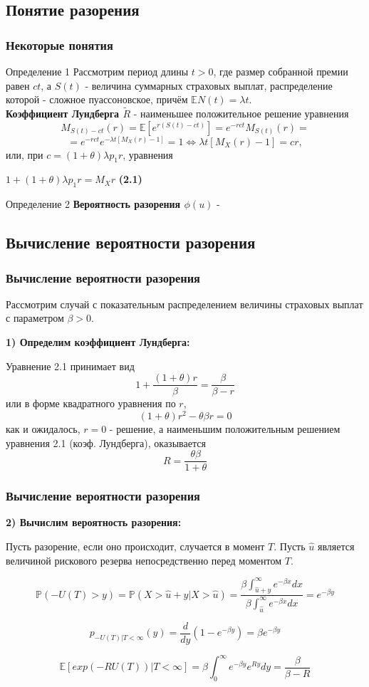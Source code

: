 \documentclass[12pt]{beamer}
\begin{document}
\begin{frame}
\section{Понятие разорения}
\frametitle{Некоторые понятия}
\begin{block}{Определение 1}
Рассмотрим период длины $t > 0$, где размер собранной  премии равен $ct$, а $S(t)$ - величина суммарных страховых выплат, распределение которой - сложное пуассоновское, причём $\mathbb{E}N(t) = {\lambda}t$.
\\ \textbf{Коэффициент Лундберга $\widetilde{R}$} - наименьшее положительное решение уравнения $$M_{S(t)-ct}(r) = \mathbb{E}[e^{r(S(t)-ct)}] = e^{-rct}M_{S(t)}(r) = $$ $$= e^{-rct}e^{-{\lambda}t[M_{X}(r)-1]} = 1 \Leftrightarrow {\lambda}t[M_{X}(r)-1] = cr,$$или, при $c = (1+{\theta}){\lambda}p_{1}r$, уравнения 
\begin{center}$1+(1+\theta){\lambda}p_{1}r = M_{X}r$ \textbf{(2.1)} \end{center}
\end{block}
\begin{block}{Определение 2}
\textbf{Вероятность разорения $\phi(u)$} - 
\end{block}
\end{frame}


\begin{frame}
\section{Вычисление вероятности разорения}
\frametitle{Вычисление вероятности разорения}
Рассмотрим случай с показательным распределением величины страховых выплат с параметром $\beta > 0$.

\textbf{1) Определим коэффициент Лундберга:}

Уравнение 2.1 принимает вид
$$1 + \frac{(1 + \theta)r}{\beta}=\frac{\beta}{\beta-r}$$
или в форме квадратного уравнения по $r$,
$$(1 + \theta)r^2 - \theta\beta r = 0$$
как и ожидалось, $r = 0$ - решение, а наименьшим положительным решением уравнения 2.1
(коэф. Лундберга), оказывается 
$$R = \frac{\theta\beta}{1 + \theta}$$
\end{frame}

\begin{frame}
\frametitle{Вычисление вероятности разорения}
\textbf{2) Вычислим вероятность разорения:}

Пусть разорение, если оно происходит, случается в момент $T$. Пусть $\hat{u}$ является величиной рискового резерва непосредственно перед моментом $T$.

$$\mathbb{P}(-U(T)>y) = \mathbb{P}(X > \hat{u} + y|X > \hat{u}) =
\frac
{\beta\int_{\hat{u}+y}^{\infty} e^{-\beta x}dx}
{\beta\int_{\hat{u}}^{\infty}   e^{-\beta x}dx}
= e^{-\beta y}$$


$$p_{-U(T)|T < \infty}(y) = \frac{d}{dy}(1-e^{-\beta y}) = \beta e^{-\beta y}$$

$$\mathbb{E}[exp(-RU(T))|T<\infty] = \beta\int_{0}^{\infty} e^{-\beta y} e^{Ry}dy =
\frac{\beta}{\beta - R}$$


\end{frame}
\end{document}
